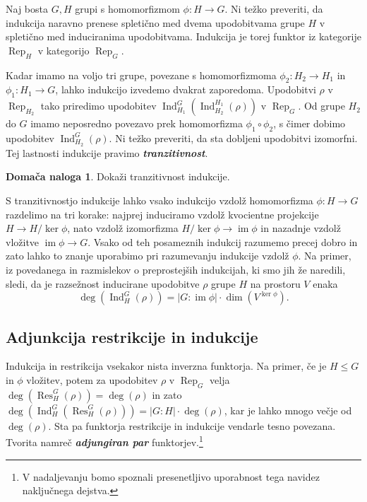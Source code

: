 \documentclass[11pt]{book}
\DeclareMathOperator\image{im}
\DeclareMathOperator\Res{Res}
\DeclareMathOperator\Ind{Ind}
\DeclareMathOperator\Rep{Rep}
\def\definicija{\color{rdeca}\bf\em}
\theoremstyle{definition}
\theoremstyle{zgled}
\theoremstyle{odprtproblem}
\theoremstyle{domacanaloga}
\newtheorem*{domacanaloga}{Domača naloga}
\theoremstyle{izrek}
\begin{document}
Naj bosta $G,H$ grupi s homomorfizmom $\phi \colon H \to G$. Ni težko preveriti, da indukcija naravno prenese spletično med dvema upodobitvama grupe $H$ v spletično med induciranima upodobitvama. Indukcija je torej funktor iz kategorije $\Rep_H$ v kategorijo $\Rep_G$.

Kadar imamo na voljo tri grupe, povezane s homomorfizmoma $\phi_2 \colon H_2 \to H_1$ in $\phi_1 \colon H_1 \to G$, lahko indukcijo izvedemo dvakrat zaporedoma. Upodobitvi $\rho$ v $\Rep_{H_2}$ tako priredimo upodobitev $\Ind^{G}_{H_1}(\Ind^{H_1}_{H_2}(\rho))$ v $\Rep_{G}$. Od grupe $H_2$ do $G$ imamo neposredno povezavo prek homomorfizma $\phi_1 \circ \phi_2$, s čimer dobimo upodobitev $\Ind^G_{H_2}(\rho)$. Ni težko preveriti, da sta dobljeni upodobitvi izomorfni. Tej lastnosti indukcije pravimo {\definicija tranzitivnost}.

\begin{domacanaloga}
    Dokaži tranzitivnost indukcije.
\end{domacanaloga}

S tranzitivnostjo indukcije lahko vsako indukcijo vzdolž homomorfizma $\phi \colon H \to G$ razdelimo na tri korake: najprej induciramo vzdolž kvocientne projekcije $H \to H/\ker \phi$, nato vzdolž izomorfizma $H/\ker \phi \to \image \phi$ in nazadnje vzdolž vložitve $\image \phi \to G$. Vsako od teh posameznih indukcij razumemo precej dobro in zato lahko to znanje uporabimo pri razumevanju indukcije vzdolž $\phi$. Na primer, iz povedanega in razmislekov o preprostejših indukcijah, ki smo jih že naredili, sledi, da je razsežnost inducirane upodobitve $\rho$ grupe $H$ na prostoru $V$ enaka
\[
    \textstyle \deg(\Ind^G_H(\rho)) = 
    |G:\image \phi| \cdot \dim(V^{\ker \phi}).
\]

\subsection{Adjunkcija restrikcije in indukcije}

Indukcija in restrikcija vsekakor nista inverzna funktorja. Na primer, če je $H \leq G$ in $\phi$ vložitev, potem za upodobitev $\rho$ v $\Rep_G$ velja $\deg(\Res^G_H(\rho)) = \deg(\rho)$ in zato $\deg(\Ind^G_H(\Res^G_H(\rho))) = |G:H| \cdot \deg(\rho)$, kar je lahko mnogo večje od $\deg(\rho)$. Sta pa funktorja restrikcije in indukcije vendarle tesno povezana. Tvorita namreč {\definicija adjungiran par} funktorjev.\footnote{V nadaljevanju bomo spoznali presenetljivo uporabnost tega navidez naključnega dejstva.}
\end{document}
